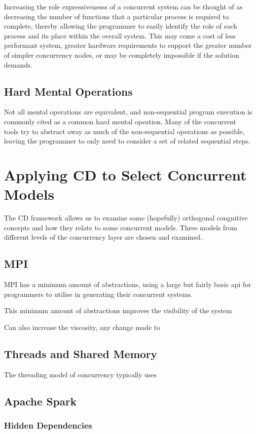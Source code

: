 \documentclass{sig-alternate}
\begin{document}
Increasing the role expressivenesss of a concurrent system can be thought of as decreasing the number of functions that a particular process is required to complete, thereby allowing the programmer to easily identify the role of each process and its place within the overall system. This may come a cost of less performant system, greater hardware requirements to support the greater number of simpler concurrency nodes, or may be completely impossible if the solution demands. 

\subsection{Hard Mental Operations}
Not all mental operations are equivalent, and non-sequential program execution is commonly cited as a common hard mental opeation. Many of the concurrent tools try to abstract away as much of the non-sequential operations as possible, leaving the programmer to only need to consider a set of related sequential steps. 

\section{Applying CD to Select Concurrent Models}
The CD framework allows us to examine some (hopefully) orthogonal congnitive concepts and how they relate to some concurrent models. Three models from different levels of the concurrency layer are chosen and examined.

\subsection{MPI}
MPI has a minimum amount of abstractions, using a large but fairly basic api for programmers to utilise in generating their concurrent systems.

This minimum amount of abstractions improves the visibility of the system

Can also increase the viscosity, any change made to 

\subsection{Threads and Shared Memory}
The threading model of concurrency typically uses 


\subsection{Apache Spark}
\subsubsection{Hidden Dependencies}
\end{document}
